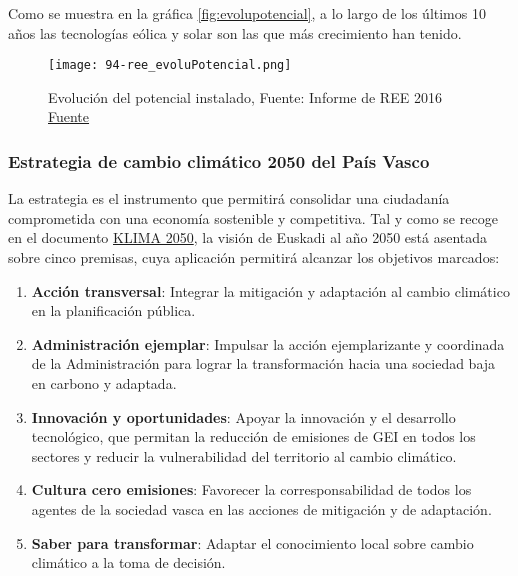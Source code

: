 Como se muestra en la gráfica \autoref{fig:evolupotencial}, a lo largo de los últimos 10
años las tecnologías eólica y solar son las que más crecimiento han
tenido.

\begin{figure}
\centering
\texttt{[image: 94-ree\_evoluPotencial.png]}
\caption[Evolución del potencial instalado]{Evolución del potencial instalado, Fuente: Informe de REE 2016 \href{http://www.ree.es/es/estadisticas-del-sistema-electrico-espanol/informe-de-energias-renovables}{Fuente}}
\label{fig:evolupotencial}
\end{figure}

\subsubsection{Estrategia de cambio climático 2050 del País
Vasco}\label{header-n177}

La estrategia es el instrumento que permitirá consolidar una ciudadanía
comprometida con una economía sostenible y competitiva. Tal y como se
recoge en el documento
\href{http://www.euskadi.eus/contenidos/documentacion/klima2050/es_def/adjuntos/KLIMA2050_es.pdf}{KLIMA
2050}, la visión de Euskadi al año 2050 está asentada sobre cinco
premisas, cuya aplicación permitirá alcanzar los objetivos marcados:

\begin{enumerate}
\def\labelenumi{\arabic{enumi}.}
\item
  \textbf{Acción transversal}: Integrar la mitigación y adaptación al
  cambio climático en la planificación pública.
\item
  \textbf{Administración ejemplar}: Impulsar la acción ejemplarizante y
  coordinada de la Administración para lograr la transformación hacia
  una sociedad baja en carbono y adaptada.
\item
  \textbf{Innovación y oportunidades}: Apoyar la innovación y el
  desarrollo tecnológico, que permitan la reducción de emisiones de GEI
  en todos los sectores y reducir la vulnerabilidad del territorio al
  cambio climático.
\item
  \textbf{Cultura cero emisiones}: Favorecer la corresponsabilidad de
  todos los agentes de la sociedad vasca en las acciones de mitigación y
  de adaptación.
\item
  \textbf{Saber para transformar}: Adaptar el conocimiento local sobre
  cambio climático a la toma de decisión.
\end{enumerate}

